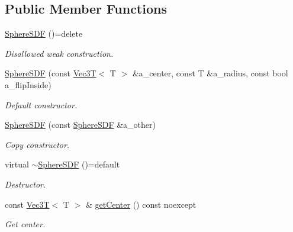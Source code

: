 \subsection*{Public Member Functions}
\begin{DoxyCompactItemize}
\item 
\mbox{\label{classSphereSDF_ad5f6d20f6ccd77ba91c00acd2aeea28f}} 
\hyperlink{classSphereSDF_ad5f6d20f6ccd77ba91c00acd2aeea28f}{Sphere\+S\+DF} ()=delete
\begin{DoxyCompactList}\small\item\em Disallowed weak construction. \end{DoxyCompactList}\item 
\hyperlink{classSphereSDF_a3e555062b1b20c1729a9f4ab6136add4}{Sphere\+S\+DF} (const \hyperlink{classVec3T}{Vec3T}$<$ T $>$ \&a\+\_\+center, const T \&a\+\_\+radius, const bool a\+\_\+flip\+Inside)
\begin{DoxyCompactList}\small\item\em Default constructor. \end{DoxyCompactList}\item 
\mbox{\label{classSphereSDF_a2c25f14a19fcb910cd4d48af7123185a}} 
\hyperlink{classSphereSDF_a2c25f14a19fcb910cd4d48af7123185a}{Sphere\+S\+DF} (const \hyperlink{classSphereSDF}{Sphere\+S\+DF} \&a\+\_\+other)
\begin{DoxyCompactList}\small\item\em Copy constructor. \end{DoxyCompactList}\item 
\mbox{\label{classSphereSDF_ab5980286d17bb9da7425b4d9d4045850}} 
virtual \hyperlink{classSphereSDF_ab5980286d17bb9da7425b4d9d4045850}{$\sim$\+Sphere\+S\+DF} ()=default
\begin{DoxyCompactList}\small\item\em Destructor. \end{DoxyCompactList}\item 
\mbox{\label{classSphereSDF_a82922ae162a9b96279cc4d0d866b303d}} 
const \hyperlink{classVec3T}{Vec3T}$<$ T $>$ \& \hyperlink{classSphereSDF_a82922ae162a9b96279cc4d0d866b303d}{get\+Center} () const noexcept
\begin{DoxyCompactList}\small\item\em Get center. \end{DoxyCompactList}\item 

\end{DoxyCompactItemize}
